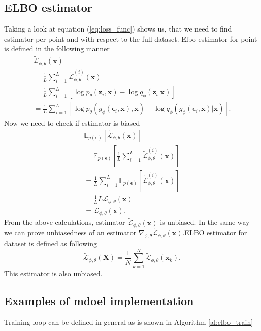 \documentclass[10pt]{article}
\begin{document}
\subsection{ELBO estimator}
Taking a look at equation (\ref{eq:loss_func}) shows us, that we need to find estimator per point and with respect to the full dataset.
Elbo estimator for point is defined in the following manner 
\begin{gather}
    \tilde{ \mathcal{L}}_{\phi, \theta}(\textbf{x})\\
    =  \frac{1}{L}\sum_{i=1}^{L}  \tilde{ \mathcal{L}}^{(i)}_{\phi, \theta}(\textbf{x})\\
    =  \frac{1}{L}\sum_{i=1}^{L} \left[ \log p_{\theta }(\textbf{z}_{i}, \textbf{x})  - \log q_{\phi }(\textbf{z}_{i}|\textbf{x})  \right]\\
    = \frac{1}{L}\sum_{i=1}^{L} \left[ \log p_{\theta }(g_{\phi} (\bm{\epsilon}_{i}, \textbf{x}), \textbf{x})  - \log q_{\phi }(g_{\phi} (\bm{\epsilon}_{i}, \textbf{x})|\textbf{x}) \right].
\end{gather}
Now we need to check if estimator is biased
\begin{gather}
     \mathbb{E}_{p( \bm{\epsilon} )} [ \tilde{ \mathcal{L}}_{\phi, \theta}(\textbf{x}) ] \\
     = \mathbb{E}_{p( \bm{\epsilon} )} \left[ 
     \frac{1}{L}\sum_{i=1}^{L}  \tilde{ \mathcal{L}}^{(i)}_{\phi, \theta}(\textbf{x}) \right]\\
     =   \frac{1}{L}\sum_{i=1}^{L}  \mathbb{E}_{p( \bm{\epsilon} )} 
     \left[  \tilde{ \mathcal{L}}^{(i)}_{\phi, \theta}(\textbf{x}) \right]  \\
     = \frac{1}{L} L \mathcal{L}_{\phi, \theta}(\textbf{x}) \\
     = \mathcal{L}_{\phi, \theta}(\textbf{x}).
\end{gather}
From the above calculations, estimator $ \tilde{ \mathcal{L}}_{\phi, \theta}(\textbf{x})$ is unbiased. In the same way we can prove unbiasedness of an estimator  $ \nabla_{\phi, \theta} \tilde{ \mathcal{L}}_{\phi, \theta}(\textbf{x})$.ELBO estimator for dataset is defined as following 
\begin{equation}
       \tilde{ \mathcal{L}}_{\phi, \theta}(\textbf{X}) = 
       \frac{1}{N}\sum_{k=1}^{N} \tilde{ \mathcal{L}}_{\phi, \theta}(\textbf{x}_{k}).
\end{equation}
This estimator is also unbiased.
\subsection{Examples of mdoel implementation}
Training loop can be defined in general as is shown in Algorithm \ref{al:elbo_train}
\end{document}
